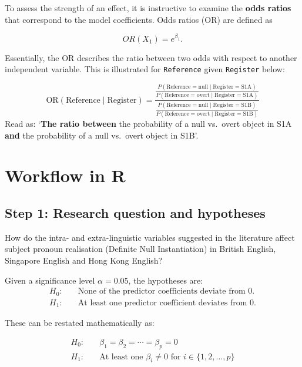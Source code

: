 \documentclass[
  11pt,
  letterpaper,
  DIV=11,
  numbers=noendperiod]{scrreprt}
\begin{document}
To assess the strength of an effect, it is instructive to examine the
\textbf{odds ratios} that correspond to the model coefficients. Odds
ratios (OR) are defined as

\[
OR(X_1) = e^{\beta_1}.
\]

Essentially, the OR describes the ratio between two odds with respect to
another independent variable. This is illustrated for \texttt{Reference}
given \texttt{Register} below:

\[
\text{OR}(\text{Reference} \mid \text{Register}) = \frac{\frac{P(\text{Reference} = \text{null} \mid \text{Register} = \text{S1A})}{P(\text{Reference} = \text{overt} \mid \text{Register} = \text{S1A})}}{\frac{P(\text{Reference} = \text{null} \mid \text{Register} = \text{S1B})}{P(\text{Reference} = \text{overt} \mid \text{Register} = \text{S1B})}}
\] Read as: `\textbf{The ratio between} the probability of a null
vs.~overt object in S1A \textbf{and} the probability of a null vs.~overt
object in S1B'.

\section{Workflow in R}\label{workflow-in-r-2}

\subsection{Step 1: Research question and
hypotheses}\label{step-1-research-question-and-hypotheses}

How do the intra- and extra-linguistic variables suggested in the
literature affect subject pronoun realisation (Definite Null
Instantiation) in British English, Singapore English and Hong Kong
English?

Given a significance level \(\alpha = 0.05\), the hypotheses are: \[ 
\begin{aligned}
H_0: & \quad \text{None of the predictor coefficients deviate from 0}.\\
H_1: & \quad \text{At least one predictor coefficient deviates from 0}.
\end{aligned}
\]

These can be restated mathematically as:

\[ 
\begin{aligned}
H_0: & \quad \beta_1 = \beta_2 = \cdots = \beta_p = 0 \\
H_1: & \quad \text{At least one } \beta_i \neq 0 \text{ for } i \in \{1, 2, \ldots, p\}
\end{aligned} \]
\end{document}
